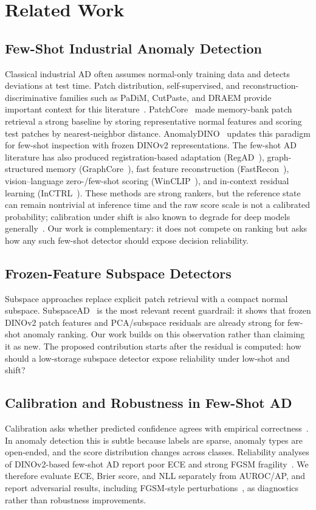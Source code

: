 \section{Related Work}
\subsection{Few-Shot Industrial Anomaly Detection}
Classical industrial AD often assumes normal-only training data and detects deviations at test time. Patch distribution, self-supervised, and reconstruction-discriminative families such as PaDiM, CutPaste, and DRAEM provide important context for this literature~\cite{padim2021,cutpaste2021,draem2021}. PatchCore~\cite{patchcore2021} made memory-bank patch retrieval a strong baseline by storing representative normal features and scoring test patches by nearest-neighbor distance. AnomalyDINO~\cite{anomalydino2024} updates this paradigm for few-shot inspection with frozen DINOv2 representations. The few-shot AD literature has also produced registration-based adaptation (RegAD~\cite{regad2022}), graph-structured memory (GraphCore~\cite{graphcore2023}), fast feature reconstruction (FastRecon~\cite{fastrecon2023}), vision--language zero-/few-shot scoring (WinCLIP~\cite{winclip2023}), and in-context residual learning (InCTRL~\cite{inctrl2024}). These methods are strong rankers, but the reference state can remain nontrivial at inference time and the raw score scale is not a calibrated probability; calibration under shift is also known to degrade for deep models generally~\cite{ovadia2019trust}. Our work is complementary: it does not compete on ranking but asks how any such few-shot detector should expose decision reliability.

\subsection{Frozen-Feature Subspace Detectors}
Subspace approaches replace explicit patch retrieval with a compact normal subspace. SubspaceAD~\cite{subspacead2026} is the most relevant recent guardrail: it shows that frozen DINOv2 patch features and PCA/subspace residuals are already strong for few-shot anomaly ranking. Our work builds on this observation rather than claiming it as new. The proposed contribution starts after the residual is computed: how should a low-storage subspace detector expose reliability under low-shot and shift?

\subsection{Calibration and Robustness in Few-Shot AD}
Calibration asks whether predicted confidence agrees with empirical correctness~\cite{platt1999,guo2017calibration}. In anomaly detection this is subtle because labels are sparse, anomaly types are open-ended, and the score distribution changes across classes. Reliability analyses of DINOv2-based few-shot AD report poor ECE and strong FGSM fragility~\cite{khan2025calibration}. We therefore evaluate ECE, Brier score, and NLL separately from AUROC/AP, and report adversarial results, including FGSM-style perturbations~\cite{goodfellow2015}, as diagnostics rather than robustness improvements.

